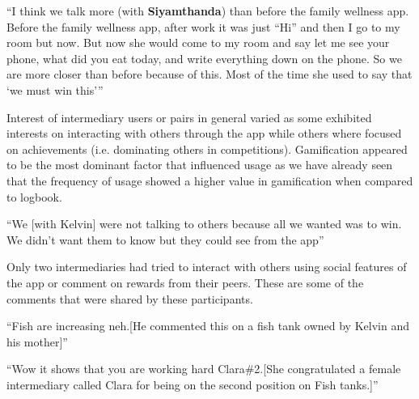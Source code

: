  {``I think we talk more (with \textbf{Siyamthanda}) than before the family wellness app. Before the family wellness app, after work it was just ``Hi'' and then I go to my room but now. But now she would come to my room  and say let me see your phone,  what did you eat today,  and write everything down on the phone. So we are more closer than before because of this. Most of the time she used to say that `we must win this'''} 

Interest of intermediary users or pairs in general varied as some exhibited interests on interacting with others through the app while others where focused on achievements (i.e. dominating others in competitions). Gamification appeared to be the most dominant factor that influenced usage as we have already seen that the frequency of usage showed a higher value in gamification when compared to logbook. 

 {``We [with Kelvin] were not talking to others because all we wanted was to win. We didn't want them to know but they could see from the app''}
 
Only two intermediaries had tried to interact with others using social features of the app or comment on rewards from their peers. These are some of the comments that were shared by these participants.

 {``Fish are increasing neh.[He commented this on a fish tank owned by Kelvin and his mother]''} 

 {``Wow it shows that you are working hard  Clara\#2.[She congratulated a female intermediary called Clara for being on the second position on Fish tanks.]''} 

